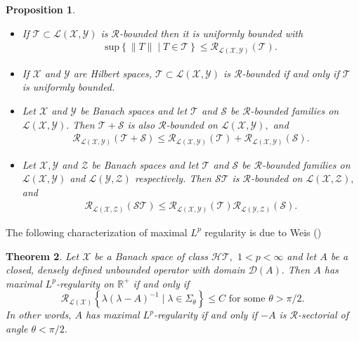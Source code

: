 \documentclass[12pt,a4paper,reqno]{amsart}
\newtheorem{theorem}{Theorem}[section]
\newtheorem{proposition}[theorem]{Proposition}
\theoremstyle{definition}
\theoremstyle{remark}
\numberwithin{equation}{section}
\newcommand{\mx}{\mathcal{X}}
\newcommand{\my}{\mathcal{Y}}
\newcommand{\mz}{\mathcal{Z}}
\newcommand{\md}{\mathcal{D}}
\newcommand{\mr}{\mathcal{R}}
\begin{document}
\begin{proposition} $ $ \label{rem:Rbd}
\begin{itemize}
\item[(1)] If $\mathcal{T} \subset \mathcal{L}(\mx,\my)$ is $\mathcal{R}$-bounded then it is uniformly bounded with
\begin{align*}
\mathrm{sup} \left\{ \|T\| \mid T \in \mathcal{T} \right\} \leqslant \mathcal{R}_{\mathcal{L}(\mx,\my)}(\mathcal{T}).
\end{align*}
\item[(2)] If $\mx$ and $\my$ are Hilbert spaces, $\mathcal{T} \subset \mathcal{L}(\mx,\my)$ is $\mr$-bounded if and only if $\mathcal{T}$  is uniformly bounded.
\item[(3)] Let $\mx$ and $\my$ be Banach spaces and let $\mathcal{T}$ and $\mathcal{S}$  be $\mathcal{R}$-bounded families on $\mathcal{L}(\mx,\my).$ Then $\mathcal{T} + \mathcal{S}$ is also $\mathcal{R}$-bounded  on $\mathcal{L}(\mx,\my),$ and
\begin{align*}
{\mathcal R}_{\mathcal{L}(\mx,\my)}(\mathcal{T} + \mathcal{S}) \leqslant {\mathcal R}_{\mathcal{L}(\mx,\my)}(\mathcal{T} ) +  {\mathcal R}_{\mathcal{L}(\mx,\my)}( \mathcal{S}).
\end{align*}
\item[(4)]  Let $\mx,\my$ and $\mz$ be Banach spaces and let $\mathcal{T}$ and $\mathcal{S}$  be $\mathcal{R}$-bounded families on $\mathcal{L}(\mx,\my)$ and $\mathcal{L}(\my,\mz)$ respectively. Then $\mathcal{S}\mathcal{T}$ is  $\mathcal{R}$-bounded  on $\mathcal{L}(\mx,\mz),$ and
\begin{align*}
{\mathcal R}_{\mathcal{L}(\mx,\mz)}(\mathcal{S} \mathcal{T} ) \leqslant {\mathcal R}_{\mathcal{L}(\mx,\my)}(\mathcal{T} )   {\mathcal R}_{\mathcal{L}(\my,\mz)}( \mathcal{S}).
\end{align*}
\end{itemize}
\end{proposition}


The following characterization of maximal $L^{p}$ regularity is due to Weis (\cite[Theorem 4.2]{Weis01})
\begin{theorem} \label{thm:Weis}
Let $\mx$ be a Banach space of class ${\mathcal{HT}},$ $1 < p < \infty$ and let $A$ be a closed, densely defined unbounded operator with domain $\md(A).$
Then $A$ has maximal $L^{p}$-regularity on $\mathbb{R}^{+}$ if and only if
\begin{equation}\label{give_number}
\mr_{\mathcal{L}(\mx)}\left\{\lambda (\lambda - A)^{-1} \mid \lambda  \in \Sigma_{\theta}\right\} \leqslant C  \mbox{ for some } \theta > \pi/2.
\end{equation}
In other words, $A$ has maximal $L^{p}$-regularity if and only if $-A$ is $\mr$-sectorial of angle $\theta < \pi/2.$
\end{theorem}
\end{document}
